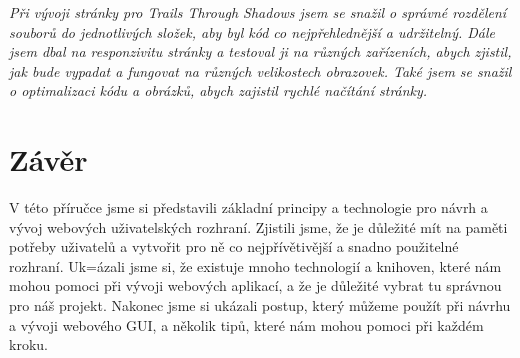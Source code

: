\textit{Při vývoji stránky pro Trails Through Shadows jsem se snažil o správné rozdělení souborů do jednotlivých složek, aby byl kód co nejpřehlednější a udržitelný. Dále jsem dbal na responzivitu stránky a testoval ji na různých zařízeních, abych zjistil, jak bude vypadat a fungovat na různých velikostech obrazovek. Také jsem se snažil o optimalizaci kódu a obrázků, abych zajistil rychlé načítání stránky.}

\section{Závěr}
\label{sec:conclusion}

V této příručce jsme si představili základní principy a technologie pro návrh a vývoj webových uživatelských rozhraní. Zjistili jsme, že je důležité mít na paměti potřeby uživatelů a vytvořit pro ně co nejpřívětivější a snadno použitelné rozhraní. Uk=ázali jsme si, že existuje mnoho technologií a knihoven, které nám mohou pomoci při vývoji webových aplikací, a že je důležité vybrat tu správnou pro náš projekt. Nakonec jsme si ukázali postup, který můžeme použít při návrhu a vývoji webového GUI, a několik tipů, které nám mohou pomoci při každém kroku.